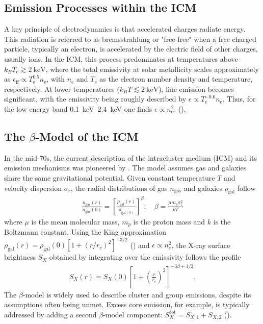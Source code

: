 \subsection{Emission Processes within the ICM}\label{subsec:emission}
A key principle of electrodynamics is that accelerated charges radiate energy. This radiation is referred to as bremsstrahlung or "free-free" when a free charged particle, typically an electron, is accelerated by the electric field of other charges, usually ions. In the ICM, this process predominates at temperatures above \(k_B T_\text{e} \gtrsim \SI{2}{\kilo\electronvolt}\), where the total emissivity at solar metallicity scales approximately as \(\epsilon_{\text{ff}} \propto T_\text{e}^{0.5} n_\text{e}\), 
with \(n_\text{e}\) and \(T_\text{e}\) as the electron number density and temperature, respectively. At lower temperatures (\(k_B T \lesssim \SI{2}{\kilo\electronvolt}\)), line emission becomes significant, with the emissivity being roughly described by \(\epsilon \propto T_\text{e}^{-0.6} n_\text{e}\).
Thus, for the low energy band \SIrange{0.1}{2.4}{\kilo\electronvolt} one finds \(\epsilon \propto n_\text{e}^2.\) (\cite{Reiprich2019}).
%
\subsection{The \(\beta\)-Model of the ICM}
In the mid-70s, the current description of the intracluster medium (ICM) and its emission mechanisms was pioneered by \cite{Cavaliere_1976}. The model assumes gas and galaxies share the same gravitational potential. Given constant temperature \(T\) and velocity dispersion \(\sigma_r\), the radial distributions of gas \(n_{\text{gas}}\) and galaxies \(\rho_{\text{gal}}\) follow
\begin{align*}
    \frac{n_\text{gas}(r)}{n_{\text{gas}}(0)} = \left[\frac{\rho_{\text{gal}}(r)}{\rho_{\text{gal}(0)}}\right]^{\beta}; \quad \beta = \frac{\mu m_p \sigma_r^2}{kT}
\end{align*}
where \(\mu\) is the mean molecular mass, \(m_p\) is the proton mass and \(k\) is the Boltzmann constant. Using the King approximation \({\textstyle \rho_{\text{gal}}(r) = \rho_{\text{gal}}(0)[1 + (r/r_c)^2]^{-3/2}}\) (\cite{King1962}) and \(\epsilon \propto n_e^2\), the X-ray surface brightness \(S_X\) obtained by integrating over the emissivity follows the profile 
\begin{align*}
    S_X(r) = S_X(0)\left[1 + \left(\frac{r}{r_c}\right)^2\right]^{-3\beta + 1/2}.
\end{align*}
The \(\beta\)-model is widely used to describe cluster and group emissions, despite its assumptions often being unmet. Excess core emission, for example, is typically addressed by adding a second \(\beta\)-model component: \(S_X^{\text{tot}} = S_{X,1} + S_{X,2}\) (\cite{Reiprich2019}).
%
